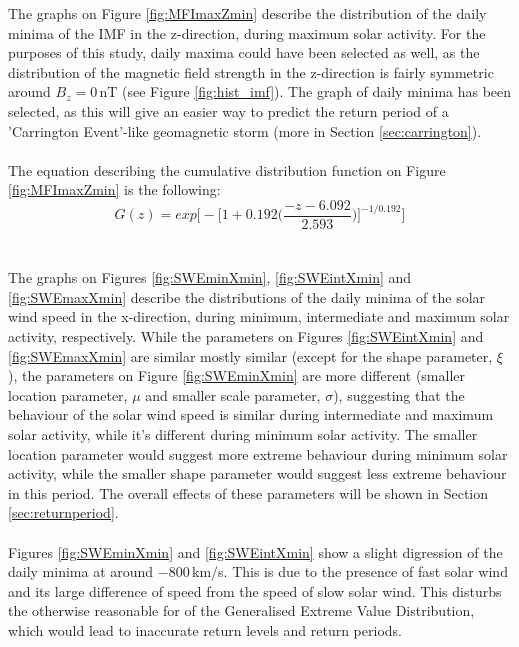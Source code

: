 \documentclass[12pt]{article}
\begin{document}
        The graphs on Figure \ref{fig:MFImaxZmin} describe the distribution of the daily minima of the IMF in the z-direction, during maximum solar activity. For the purposes of this study, daily maxima could have been selected as well, as the distribution of the magnetic field strength in the z-direction is fairly symmetric around $B_z=0\,$nT (see Figure \ref{fig:hist_imf}). The graph of daily minima has been selected, as this will give an easier way to predict the return period of a 'Carrington Event'-like geomagnetic storm (more in Section \ref{sec:carrington}).\\ \\
        The equation describing the cumulative distribution function on Figure \ref{fig:MFImaxZmin} is the following:
        \begin{equation}
            G(z) = exp\Bigg [-\Bigg [1+0.192 \Bigg (\frac{-z-6.092}{2.593}\Bigg )\Bigg ]^{-1/0.192}\Bigg ]
        \end{equation}\\ \\
        The graphs on Figures \ref{fig:SWEminXmin}, \ref{fig:SWEintXmin} and \ref{fig:SWEmaxXmin} describe the distributions of the daily minima of the solar wind speed in the x-direction, during minimum, intermediate and maximum solar activity, respectively. While the parameters on Figures \ref{fig:SWEintXmin} and \ref{fig:SWEmaxXmin} are similar mostly similar (except for the shape parameter, $\xi$), the parameters on Figure \ref{fig:SWEminXmin} are more different (smaller location parameter, $\mu$ and smaller scale parameter, $\sigma$), suggesting that the behaviour of the solar wind speed is similar during intermediate and maximum solar activity, while it's different during minimum solar activity. The smaller location parameter would suggest more extreme behaviour during minimum solar activity, while the smaller shape parameter would suggest less extreme behaviour in this period. The overall effects of these parameters will be shown in Section \ref{sec:returnperiod}.\\ \\
        Figures \ref{fig:SWEminXmin} and \ref{fig:SWEintXmin} show a slight digression of the daily minima at around $-800\,$km/s. This is due to the presence of fast solar wind and its large difference of speed from the speed of slow solar wind. This disturbs the otherwise reasonable for of the Generalised Extreme Value Distribution, which would lead to inaccurate return levels and return periods.\\ \\
\end{document}

